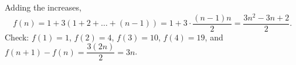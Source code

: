 Adding the increases,
\[
f(n)=1+3(1+2+\dots+(n-1))=1+3\cdot\dfrac{(n-1)n}{2}=\boxed{\dfrac{3n^2-3n+2}{2}} .
\]
Check: $f(1)=1$, $f(2)=4$, $f(3)=10$, $f(4)=19$, and $f(n+1)-f(n)=\dfrac{3(2n)}{2}=3n$.
